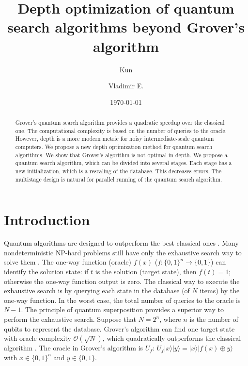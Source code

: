 \documentclass[%
 twocolumn,
 10pt,
 superscriptaddress,
 longbibliography,
 amsmath,amssymb,
 aps,
 pra,
floatfix,
]{revtex4-1}
\begin{document}
\title{Depth optimization of quantum search algorithms beyond Grover's algorithm}%

\author{Kun }
\author{Vladimir  E. }

\date{\today}

\begin{abstract}

	Grover's quantum search algorithm provides a quadratic speedup over the classical one. The computational complexity is based on the number of queries to the oracle. However, depth is a more modern metric for noisy intermediate-scale quantum computers. We propose a new depth optimization method for quantum search algorithms. We show that Grover's algorithm is not optimal in depth. We propose a quantum search algorithm, which can be divided into several stages. Each stage has a new initialization, which is a rescaling of the database. This decreases errors. The multistage design is natural for parallel running of the quantum search algorithm.

\end{abstract}

\maketitle

\section{\label{sec:intro}Introduction}

Quantum algorithms are designed to outperform the best classical ones \cite{NC10}. Many nondeterministic NP-hard problems still have only the exhaustive search way to solve them \cite{BBBV96}. The one-way function (oracle) $f(x)$ ($f:\{0,1\}^n\rightarrow \{0,1\}$) can identify the solution state: if $t$ is the solution (target state), then $f(t)=1$; otherwise the one-way function output is zero. The classical way to execute the exhaustive search is by querying each state in the database (of $N$ items) by the one-way function. In the worst case, the total number of queries to the oracle is $N-1$. The principle of quantum superposition provides a superior way to perform the exhaustive search. Suppose that $N=2^n$, where $n$ is the number of qubits to represent the database. Grover's algorithm can find one target state with oracle complexity $\mathcal O(\sqrt N)$, which quadratically outperforms the classical algorithm \cite{Grover97,GK17}. The oracle in Grover's algorithm is $U_f$: $U_f|x\rangle|y\rangle=|x\rangle|f(x)\oplus y\rangle$ with $x\in\{0,1\}^n$ and $y\in\{0,1\}$.
\end{document}
